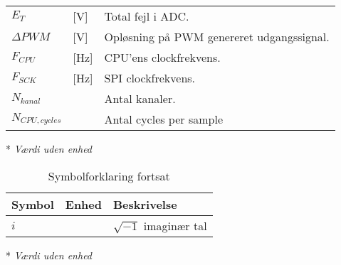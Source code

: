 \begin{table}[h!]
\begin{threeparttable}
\begin{tabular}{l l l}
$E_T$ & [\si{\volt}] & Total fejl i ADC. \\
$\Delta PWM$ & [\si{\volt}] & Opløsning på PWM genereret udgangssignal. \\
$F_{CPU}$ & [\si{\hertz}] & CPU'ens clockfrekvens. \\
$F_{SCK}$ & [\si{\hertz}] & SPI clockfrekvens.\\
$N_{kanal}$\tnote{*} & & Antal kanaler. \\
$N_{CPU,cycles}$ & & Antal cycles per sample \\
\bottomrule
\end{tabular}
\begin{tablenotes}
\item[*] \textit{Værdi uden enhed}
\end{tablenotes}
\end{threeparttable}
\end{table}




\begin{table}[h!]
\centering
\caption{Symbolforklaring fortsat}
\label{tab:symboler2}
\begin{threeparttable}
\begin{tabular}{l l l}
\toprule
\multicolumn{1}{l}{Symbol}       &
\multicolumn{1}{l}{Enhed}        &
\multicolumn{1}{l}{Beskrivelse}  \\ 
\midrule
$i$\tnote{*}		&								& $\sqrt{-1}$ imaginær tal	\\
\bottomrule
\end{tabular}
\begin{tablenotes}
\item[*] \textit{Værdi uden enhed}
\end{tablenotes}
\end{threeparttable}
\end{table}


